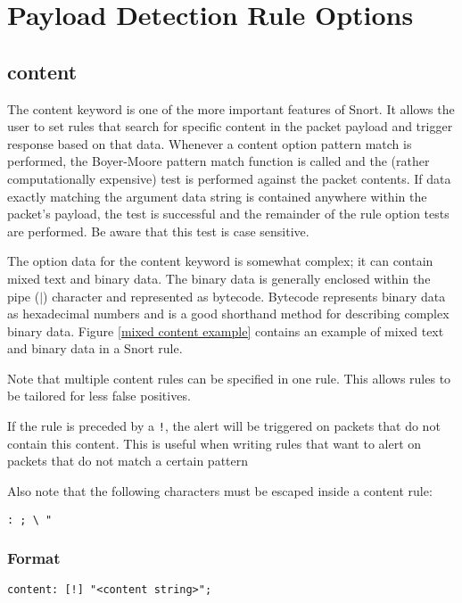 \documentclass[english]{report}
\newenvironment{note}{
\samepage
    \vspace{10pt}{\textsf{
        {\hspace{7pt}\Huge{$\triangle$\hspace{-12.5pt}{\Large{$^!$}}}}\hspace{5pt}
        {\Large{NOTE}}
    }
    }
   \begin{center}
    \par\vspace{-17pt}

    \begin{lrbox}{\savepar}
    \begin{minipage}[r]{6in}
}
{
    \end{minipage}
    \end{lrbox}
    \fbox{
        \usebox{
            \savepar
	}
    }
    \par\vskip10pt
    \end{center}
}
\begin{document}
\section{Payload Detection Rule Options}
\subsection{content\label{sub:content}}

The content keyword is one of the more important features of Snort.
It allows the user to set rules that search for specific content in
the packet payload and trigger response based on that data. Whenever
a content option pattern match is performed, the Boyer-Moore pattern
match function is called and the (rather computationally expensive)
test is performed against the packet contents. If data exactly matching
the argument data string is contained anywhere within the packet's
payload, the test is successful and the remainder of the rule option
tests are performed. Be aware that this test is case sensitive.

The option data for the content keyword is somewhat complex; it can
contain mixed text and binary data. The binary data is generally enclosed
within the pipe ($|$) character and represented
as bytecode. Bytecode represents binary data as hexadecimal numbers
and is a good shorthand method for describing complex binary data.
Figure \ref{mixed content example} contains an example of mixed text
and binary data in a Snort rule. 

Note that multiple content rules can be specified in one rule. This
allows rules to be tailored for less false positives. 

If the rule is preceded by a \texttt{!}, the alert will be triggered
on packets that do not contain this content. This is useful when writing
rules that want to alert on packets that do not match a certain pattern

\begin{note}
Also note that the following characters must be escaped inside a content
rule:

\begin{verbatim}
: ; \ "
\end{verbatim}
\end{note}


\subsubsection{Format}

\begin{verbatim}
content: [!] "<content string>";
\end{verbatim}
\end{document}
